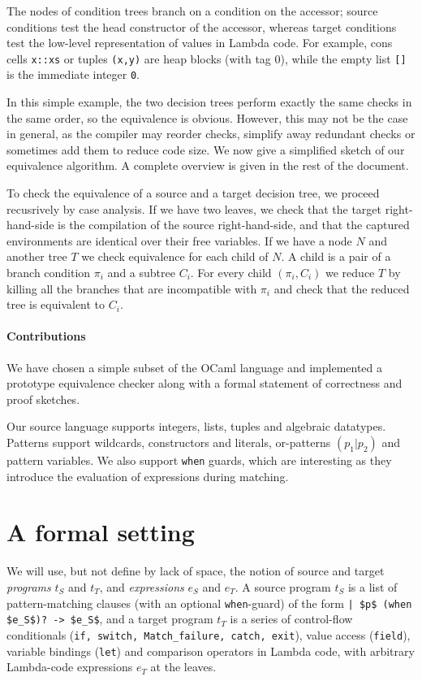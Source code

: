 \documentclass[12pt]{article}
\begin{document}
The nodes of condition trees branch on a condition on the accessor;
source conditions test the head constructor of the accessor, whereas
target conditions test the low-level representation of values in
Lambda code. For example, cons cells \texttt{x::xs} or tuples
\texttt{(x,y)} are heap blocks (with tag 0), while the empty list
\texttt{[]} is the immediate integer \texttt{0}.

In this simple example, the two decision trees perform exactly the
same checks in the same order, so the equivalence is obvious. However,
this may not be the case in general, as the compiler may reorder
checks, simplify away redundant checks or sometimes add them to reduce
code size.
%
We now give a simplified sketch of our equivalence
algorithm. A complete overview is given in the rest of the document.

To check the equivalence of a source and a target decision tree,
we proceed recusrively by case analysis.
%
If we have two leaves, we check that the target right-hand-side is the
compilation of the source right-hand-side, and that the captured
environments are identical over their free variables.
%
If we have a node $N$ and another tree $T$ we check equivalence for
each child of $N$. A child is a pair of a branch condition $\pi_i$ and a
subtree $C_i$. For every child $(\pi_i, C_i)$ we reduce $T$ by killing all
the branches that are incompatible with $\pi_i$ and check that the
reduced tree is equivalent to $C_i$.

\paragraph{Contributions} We have chosen a simple subset of the OCaml
language and implemented a prototype equivalence checker along with
a formal statement of correctness and proof sketches.

Our source language supports integers, lists, tuples and algebraic
datatypes. Patterns support wildcards, constructors and literals,
or-patterns $(p_1 | p_2)$ and pattern variables.  We also support
\texttt{when} guards, which are interesting as they introduce the
evaluation of expressions during matching.

\section{A formal setting}

We will use, but not define by lack of space, the notion of source and
target \emph{programs} $t_S$ and $t_T$, and \emph{expressions} $e_S$
and $e_T$. A source program $t_S$ is a list of pattern-matching
clauses (with an optional \texttt{when}-guard) of the form
\lstinline{| $p$ (when $e_S$)? -> $e_S$}, and a target program $t_T$
is a series of control-flow conditionals (\texttt{if, switch,
  Match\_failure, catch, exit}), value access (\texttt{field}),
variable bindings (\texttt{let}) and comparison operators in Lambda
code, with arbitrary Lambda-code expressions $e_T$ at the leaves.
\end{document}
